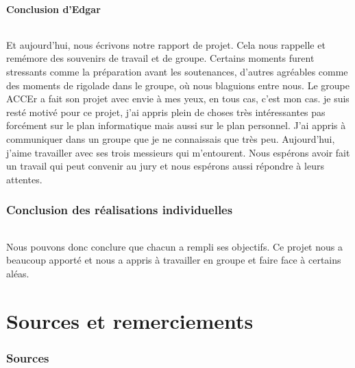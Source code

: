 \documentclass[titlepage, 13px, a4paper]{report}
\begin{document}
\newpage

\subsection{Conclusion d'Edgar}
\paragraph*{} \hspace{0pt}
Et aujourd’hui, nous écrivons notre rapport de projet. Cela nous rappelle et remémore des souvenirs de travail et 
de groupe. Certains moments furent stressants comme la préparation avant les soutenances, 
d’autres agréables comme des moments de rigolade dans le groupe, où nous blaguions entre nous. Le groupe 
ACCEr a fait son projet avec envie à mes yeux, en tous cas, c’est mon cas. je suis resté motivé pour ce projet, 
j’ai appris plein de choses très intéressantes pas forcément sur le plan informatique mais aussi sur le plan 
personnel. J’ai appris à communiquer dans un groupe que je ne connaissais que très peu. Aujourd’hui, j’aime 
travailler avec ses trois messieurs qui m’entourent. Nous espérons avoir fait un travail qui peut convenir 
au jury et nous espérons aussi répondre à leurs attentes. 

\newpage

\section*{Conclusion des réalisations individuelles}
\paragraph*{} \hspace{0pt}
Nous pouvons donc conclure que chacun a rempli ses objectifs.
Ce projet nous a beaucoup apporté et nous a appris à travailler en groupe et faire face à certains aléas.



\newpage


\part{Sources et remerciements}

\section{Sources}
\end{document}
